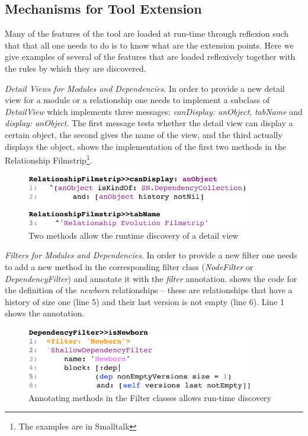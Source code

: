 \documentclass[preprint,12pt]{elsarticle}
\newcommand{\cd}[1]{{\em{#1}}}
\begin{document}
\subsection {Mechanisms for Tool Extension}
\label{sec:extensible}
Many of the features of the tool are loaded at run-time through reflexion such that that all one needs to do is to know what are the extension points. Here we give examples of several of the features that are loaded reflexively together with the rules by which they are discovered.

\begin{description}
\item {\em Detail Views for Modules and Dependencies}. In order to provide a new detail view for a module or a relationship one needs to implement a subclass of {\em DetailView} which implements three messages: \cd{canDisplay: anObject}, \cd{tabName} and \cd{display: anObject}. The first message tests whether the detail view can display a certain object, the second gives the name of the view, and the third actually displays the object.  shows the implementation of the first two methods in the Relationship Filmstrip\footnote{The examples are in Smalltalk}.

\begin{figure}[h]
\begin{center}
\includegraphics[width=10cm]{images/filmstrip-sample}
\caption{Two methods allow the runtime discovery of a detail view}
\end{center}
\end{figure}

\item {\em Filters for Modules and Dependencies}. In order to provide a new filter one needs to add a new method in the corresponding filter class (\cd{NodeFilter} or \cd{DependencyFilter}) and annotate it with the \cd{filter} annotation.  shows the code for the definition of the {\em newborn} relationships -- these are relationships that have a history of size one (line 5) and their last version is not empty (line 6). Line 1 shows the annotation.

\begin{figure}[h]
\begin{center}
\includegraphics[width=10cm]{images/filter-sample}
\caption{Annotating methods in the Filter classes allows run-time discovery}
\end{center}
\end{figure}



\end{description}
\end{document}
